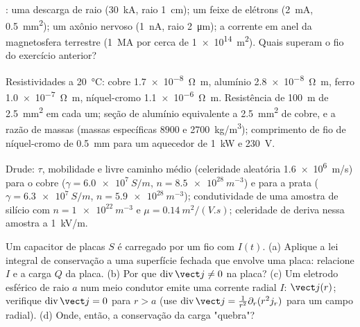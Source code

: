 \begin{exercise}[$\star$]\label{exo:b2:charges-currents-conduction:2}
: uma descarga de raio (\qty{30}{kA}, raio \qty{1}{cm}); um
feixe de elétrons (\qty{2}{mA}, \qty{0.5}{mm^2}); um axônio nervoso (\qty{1}{nA}, raio
\qty{2}{\micro m}); a corrente em anel da magnetosfera terrestre (\qty{1}{MA} por
cerca de \qty{1e14}{m^2}). Quais superam o fio do exercício anterior?
\end{exercise}

\begin{exercise}[$\star$]\label{exo:b2:charges-currents-conduction:3}
Resistividades a \qty{20}{\degreeCelsius}: cobre \qty{1.7e-8}{\ohm.m}, alumínio
\qty{2.8e-8}{\ohm.m}, ferro \qty{1.0e-7}{\ohm.m}, níquel-cromo \qty{1.1e-6}{\ohm.m}.
Resistência de \qty{100}{m} de \qty{2.5}{mm^2} em cada um; seção de alumínio
equivalente a \qty{2.5}{mm^2} de cobre, e a razão de massas (massas específicas
$8900$ e \qty{2700}{kg/m^3}); comprimento de fio de níquel-cromo de \qty{0.5}{mm} para um
aquecedor de \qty{1}{kW} e \qty{230}{V}.
\end{exercise}

\begin{exercise}[$\star$]\label{exo:b2:charges-currents-conduction:4}
Drude: $\tau$, mobilidade e livre caminho médio (celeridade aleatória \qty{1.6e6}{m/s})
para o cobre ($\gamma = \qty{6.0e7}{S/m}$, $n = \qty{8.5e28}{m^{-3}}$) e para a prata
($\gamma = \qty{6.3e7}{S/m}$, $n = \qty{5.9e28}{m^{-3}}$); condutividade de uma
amostra de silício com $n = \qty{1e22}{m^{-3}}$ e $\mu = \qty{0.14}{m^2/(V.s)}$;
celeridade de deriva nessa amostra a \qty{1}{kV/m}.
\end{exercise}

\begin{exercise}[$\star\star$]\label{exo:b2:charges-currents-conduction:5}
Um capacitor de placas $S$ é carregado por um fio com $I(t)$. (a) Aplique
a lei integral de conservação a uma superfície fechada que envolve uma placa:
relacione $I$ e a carga $Q$ da placa. (b) Por que $\operatorname{div}\vect j \ne 0$
na placa? (c) Um eletrodo esférico de raio $a$ num meio condutor
emite uma corrente radial $I$: $\vect j(r)$; verifique $\operatorname{div}
\vect j = 0$ para $r > a$ (use $\operatorname{div}\vect j = \frac1{r^2}\partial_r(r^2j_r)$
para um campo radial). (d) Onde, então, a conservação da carga
"quebra"?
\end{exercise}


